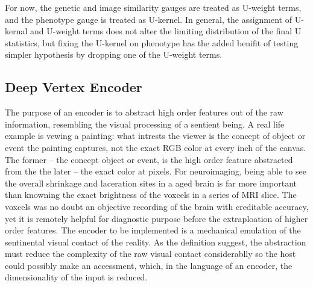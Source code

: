 For now, the genetic and image similarity gauges are treated as U-weight terms, and the phenotype gauge is treated as U-kernel. In general, the assignment of U-kernal and U-weight terms does not alter the limiting distribution of the final U statistics, but fixing the U-kernel on phenotype has the added benifit of testing simpler hypothesis by dropping one of the U-weight terms.

\subsection{Deep Vertex Encoder}
The purpose of an encoder is to abstract high order features out of the raw information, resembling the visual processing of a sentient being. A real life example is vewing a painting: what intrests the viewer is the concept of object or event the painting captures, not the exact RGB color at every inch of the canvas. The former -- the concept object or event, is the high order feature abstracted from the the later -- the exact color at pixels. For neuroimaging, being able to see the overall shrinkage and laceration sites in a aged brain is far more important than knowning the exact brightness of the voxcels in a series of MRI slice. The voxcels was no doubt an objective recording of the brain with creditable accuracy, yet it is remotely helpful for diagnostic purpose before the extraploation of higher order features. The encoder to be implemented is a mechanical emulation of the sentinental visual contact of the reality. As the definition suggest, the abstraction must reduce the complexity of the raw visual contact considerablly so the host could possibly make an accessment, which, in the language of an encoder, the dimensionality of the input is reduced.  

